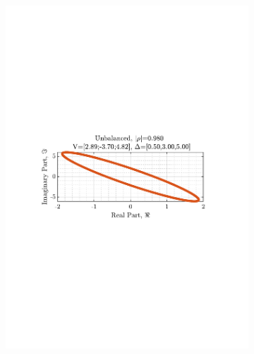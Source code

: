 \documentclass[12pt]{article}
\begin{document}
\begin{figure}[H]
\begin{subfigure}{0.49\textwidth}
					\includegraphics[trim={2.2cm 11.2cm 3.00cm  11.2cm}, clip, width=\textwidth]{../MATLAB/figures/q3_1c_fig02.pdf} 
					\captionsetup{justification=centering}
				\end{subfigure}
			

\end{figure}
\end{document}
